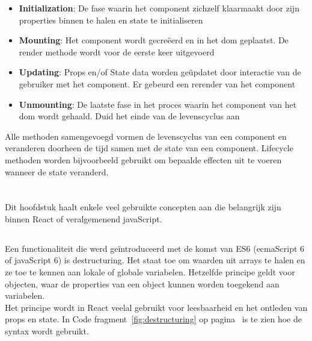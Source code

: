 \begin{itemize}[label={}]
    \item \textbf{Initialization}:
    De fase waarin het component zichzelf klaarmaakt door zijn properties binnen te halen en state te initialiseren \newline
    \item \textbf{Mounting}:
    Het component wordt gecreëerd en in het \gls{dom} geplaatst. De render methode wordt voor de eerste keer uitgevoerd  \newline
    \item \textbf{Updating}:
    Props en/of State data worden geüpdatet door interactie van de gebruiker met het component. Er gebeurd een rerender van het component \newline
    \item \textbf{Unmounting}:
    De laatste fase in het proces waarin het component van het \gls{dom} wordt gehaald. Duid het einde van de levenscyclus aan
\end{itemize}

Alle methoden samengevoegd vormen de levenscyclus van een component en veranderen doorheen de tijd samen met de state van een component. Lifecycle methoden worden bijvoorbeeld gebruikt om bepaalde effecten uit te voeren wanneer de state veranderd.

\section{}
\label{sec:frameworkConcepts}

Dit hoofdstuk haalt enkele veel gebruikte concepten aan die belangrijk zijn binnen React of veralgemenend javaScript.

\subsection{}
\label{sec:destructuring}

Een functionaliteit die werd geïntroduceerd met de komst van ES6 (\gls{ecma}Script 6 of javaScript 6) is destructuring. Het staat toe om waarden uit arrays te halen en ze toe te kennen aan lokale of globale variabelen. Hetzelfde principe geldt voor objecten, waar de properties van een object kunnen worden toegekend aan variabelen.\\
Het principe wordt in React veelal gebruikt voor leesbaarheid en het ontleden van props en state. In Code fragment~\ref{fig:destructuring} op pagina~\pageref{fig:destructuring} is te zien hoe de syntax wordt gebruikt.\\

